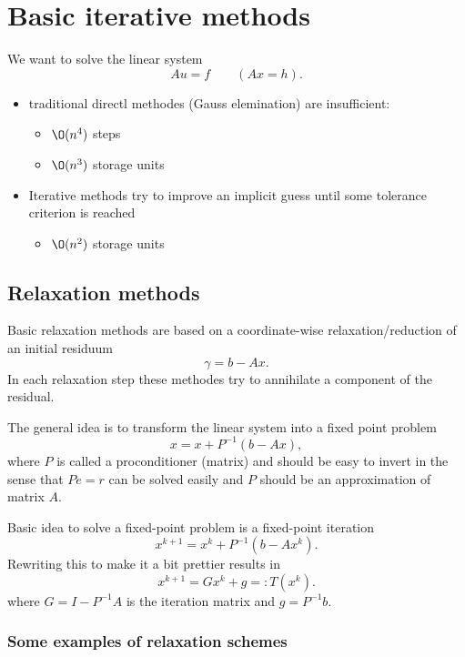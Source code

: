 \chapter{Basic iterative methods}%
\label{cha:Basic iterative methods}

We want to solve the linear system
\[
	Au = f \qquad (Ax = h)
.\] 
\begin{itemize}
	\item traditional directl methodes (Gauss elemination) are insufficient:
		\begin{itemize}
			\item $\O(n^{4})$ steps
			\item $\O(n^{3})$ storage units
		\end{itemize}

	\item Iterative methods try to improve an implicit guess until some tolerance criterion is reached
		\begin{itemize}
			\item $\O(n^{2})$ storage units
		\end{itemize}
\end{itemize}

\section{Relaxation methods}%
\label{sec:Relaxation methods}

Basic relaxation methods are based on a coordinate-wise relaxation/reduction of an initial residuum
\[
\gamma = b- Ax
.\] 
In each relaxation step these methodes try to annihilate a component of the residual.

The general idea is to transform the linear system into a fixed point problem
\[
	x = x + P^{-1}(b-Ax)
,\] 
where $P$ is called a proconditioner (matrix) and should be easy to invert in the sense that $Pe=r$ can be solved easily and $P$ should be an approximation of matrix $A$.

Basic idea to solve a fixed-point problem is a fixed-point iteration
\[
	x^{k+1} = x^{k} + P^{-1}(b-Ax^{k})
.\] 
Rewriting this to make it a bit prettier results in
\[
	x^{k+1} = Gx^{k} + g =:T(x^{k})
.\] 
where $G = I-P^{-1}A$ is the iteration matrix and $g = P^{-1}b$.

\subsection{Some examples of relaxation schemes}
\label{sec:Some examples of relaxation schemes}

